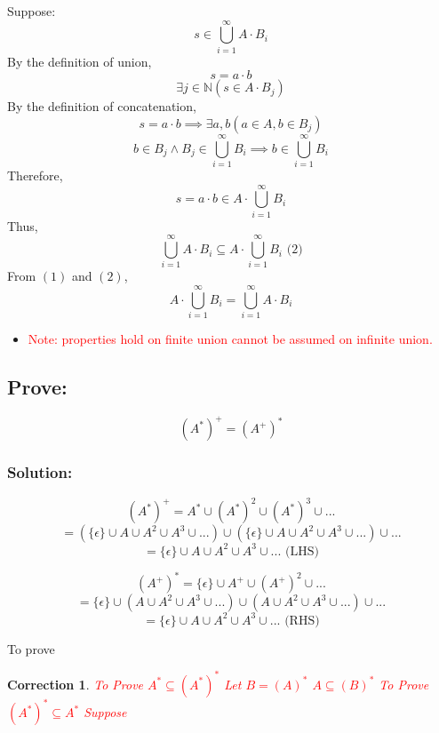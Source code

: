 \documentclass[12pt]{article}
\newtheorem{Correction}{Correction}
\begin{document}
Suppose:
\[s\in \bigcup\limits_{i=1}^{\infty}A\cdot B_i\]
By the definition of union,
\[s = a \cdot b\]
\[\exists j \in \mathbb{N}(s \in A\cdot B_j)\]
By the definition of concatenation,
\[s = a \cdot b \implies \exists a, b (a \in A, b\in B_j )\]
\[b\in B_j \land B_j \in \bigcup\limits_{i=1}^{\infty}B_i \implies b \in \bigcup\limits_{i=1}^{\infty}B_i\]
Therefore, 
\[s = a\cdot b \in A \cdot \bigcup\limits_{i=1}^{\infty}B_i\]
Thus,
\[
 \bigcup\limits_{i=1}^{\infty}A\cdot B_i\subseteq A\cdot\bigcup\limits_{i=1}^{\infty} B_i \text{      (2)}
\]
From \((1)\) and \((2)\),
\[
A\cdot\bigcup\limits_{i=1}^{\infty} B_i=\bigcup\limits_{i=1}^{\infty}A\cdot B_i
\]

\begin{itemize}
    \item \textcolor{red}{Note: properties hold on finite union cannot be assumed on infinite union.}
\end{itemize}

\subsection*{Prove:} 
\[
(A^*)^+=(A^+)^*
\]
\subsubsection*{Solution:}
\[(A^*)^+ = A^* \cup (A^*)^2 \cup (A^*)^3 \cup ... \]
\[= (\{\epsilon\} \cup A \cup A^2 \cup A^3 \cup ...) \cup (\{\epsilon\} \cup A \cup A^2 \cup A^3 \cup ...) \cup ...\]
\[= \{\epsilon\} \cup A \cup A^2 \cup A^3 \cup ...  \text{   (LHS)}\] 

\[(A^+)^* = \{\epsilon\} \cup A^+ \cup (A^+)^2 \cup ...\]
\[= \{\epsilon\} \cup (A \cup A^2 \cup A^3 \cup ...)\cup (A \cup A^2 \cup A^3 \cup ...)\cup ...\]
\[= \{\epsilon\} \cup A \cup A^2 \cup A^3 \cup ...  \text{   (RHS)}\] 

To prove 

\begin{Correction}
    \textcolor{red}{\newline
        To Prove \(A^* \subseteq (A^*)^*\) \newline
        Let \(B = (A)^*\)
        \(A \subseteq (B)^*\)   \newline
        To Prove \((A^*)^* \subseteq A^*\)\newline
        Suppose \(\)
    }
\end{Correction}
\end{document}
